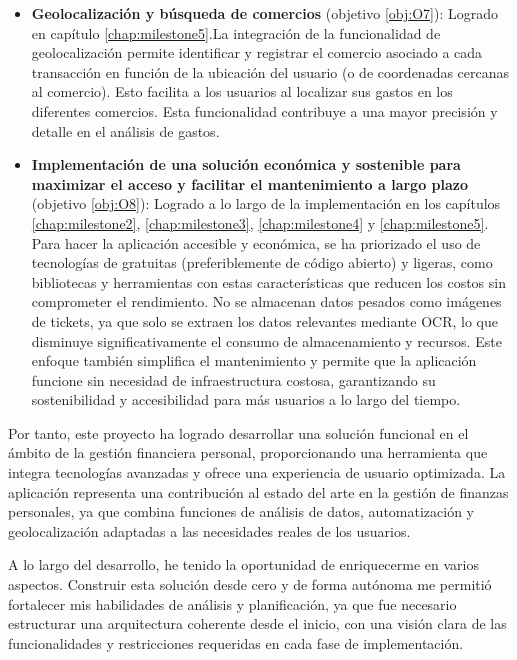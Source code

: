 \begin{itemize}
    \item \textbf{Geolocalización y búsqueda de comercios} (objetivo \ref{obj:O7}): Logrado en capítulo \ref{chap:milestone5}.La integración de la funcionalidad de geolocalización permite identificar y registrar el comercio asociado a cada transacción en función de la ubicación del usuario (o de coordenadas cercanas al comercio). Esto facilita a los usuarios al localizar sus gastos en los diferentes comercios. Esta funcionalidad contribuye a una mayor precisión y detalle en el análisis de gastos.
    
    \item \textbf{Implementación de una solución económica y sostenible para maximizar el acceso y facilitar el mantenimiento a largo plazo} (objetivo \ref{obj:O8}): Logrado a lo largo de la implementación en los capítulos \ref{chap:milestone2}, \ref{chap:milestone3}, \ref{chap:milestone4} y \ref{chap:milestone5}. Para hacer la aplicación accesible y económica, se ha priorizado el uso de tecnologías de gratuitas (preferiblemente de código abierto) y ligeras, como bibliotecas y herramientas con estas características que reducen los costos sin comprometer el rendimiento. No se almacenan datos pesados como imágenes de tickets, ya que solo se extraen los datos relevantes mediante OCR, lo que disminuye significativamente el consumo de almacenamiento y recursos. Este enfoque también simplifica el mantenimiento y permite que la aplicación funcione sin necesidad de infraestructura costosa, garantizando su sostenibilidad y accesibilidad para más usuarios a lo largo del tiempo.

\end{itemize}

Por tanto, este proyecto ha logrado desarrollar una solución funcional en el ámbito de la gestión financiera personal, proporcionando una herramienta que integra tecnologías avanzadas y ofrece una experiencia de usuario optimizada. La aplicación representa una contribución al estado del arte en la gestión de finanzas personales, ya que combina funciones de análisis de datos, automatización y geolocalización adaptadas a las necesidades reales de los usuarios.

A lo largo del desarrollo, he tenido la oportunidad de enriquecerme en varios aspectos. Construir esta solución desde cero y de forma autónoma me permitió fortalecer mis habilidades de análisis y planificación, ya que fue necesario estructurar una arquitectura coherente desde el inicio, con una visión clara de las funcionalidades y restricciones requeridas en cada fase de implementación.

